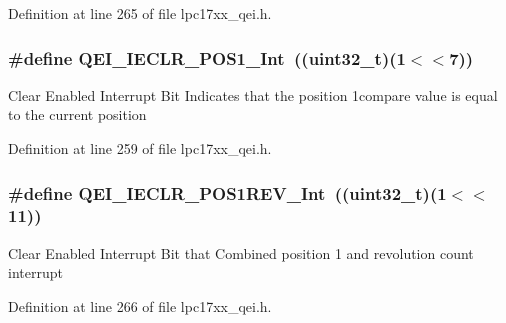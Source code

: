 \-Definition at line 265 of file lpc17xx\-\_\-qei.\-h.

\hypertarget{group___q_e_i___private___macros_gae8937a2e652e8a09e7bdd1500f90ccdb}{
\subsubsection[{\-Q\-E\-I\-\_\-\-I\-E\-C\-L\-R\-\_\-\-P\-O\-S1\-\_\-\-Int}]{\setlength{\rightskip}{0pt plus 5cm}\#define {\bf \-Q\-E\-I\-\_\-\-I\-E\-C\-L\-R\-\_\-\-P\-O\-S1\-\_\-\-Int}~((uint32\-\_\-t)(1$<$$<$7))}}\label{group___q_e_i___private___macros_gae8937a2e652e8a09e7bdd1500f90ccdb}
\-Clear \-Enabled \-Interrupt \-Bit \-Indicates that the position 1compare value is equal to the current position 

\-Definition at line 259 of file lpc17xx\-\_\-qei.\-h.

\hypertarget{group___q_e_i___private___macros_ga7620d50198217707434a977bbc5d194d}{
\subsubsection[{\-Q\-E\-I\-\_\-\-I\-E\-C\-L\-R\-\_\-\-P\-O\-S1\-R\-E\-V\-\_\-\-Int}]{\setlength{\rightskip}{0pt plus 5cm}\#define {\bf \-Q\-E\-I\-\_\-\-I\-E\-C\-L\-R\-\_\-\-P\-O\-S1\-R\-E\-V\-\_\-\-Int}~((uint32\-\_\-t)(1$<$$<$11))}}\label{group___q_e_i___private___macros_ga7620d50198217707434a977bbc5d194d}
\-Clear \-Enabled \-Interrupt \-Bit that \-Combined position 1 and revolution count interrupt 

\-Definition at line 266 of file lpc17xx\-\_\-qei.\-h.

